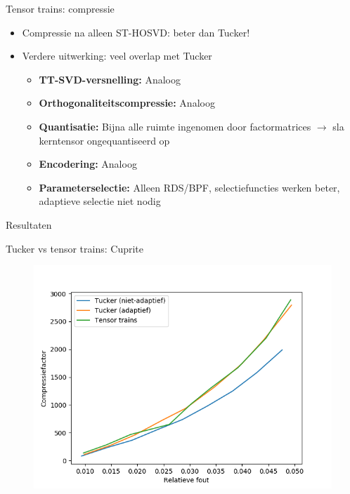 \documentclass[t,12pt,dutch
\ifx\beamermode\undefined\else,\beamermode\fi
]{beamer}
\begin{document}
\begin{frame}{Tensor trains: compressie}

\begin{itemize}
\item Compressie na alleen ST-HOSVD: beter dan Tucker!
\item Verdere uitwerking: veel overlap met Tucker
\begin{itemize}
\item \textbf{TT-SVD-versnelling:} Analoog
\item \textbf{Orthogonaliteitscompressie:} Analoog
\item \textbf{Quantisatie:} Bijna alle ruimte ingenomen door factormatrices $\rightarrow$ sla kerntensor ongequantiseerd op
\item \textbf{Encodering:} Analoog
\item \textbf{Parameterselectie:} Alleen RDS/BPF, selectiefuncties werken beter, adaptieve selectie niet nodig
\end{itemize}
\end{itemize}

\end{frame}


\begin{frame}{}
\begin{center}
\vspace*{\fill}
\vspace*{\fill}
\Huge
Resultaten
\normalsize
\vspace*{\fill}
\end{center}
\end{frame}

\begin{frame}{Tucker vs tensor trains: Cuprite}

\begin{figure}[H]
\centering
\includegraphics[scale=0.5]{images/tucker_vs_tensor_trains_Cuprite.png}
\end{figure}

\end{frame}
\end{document}
